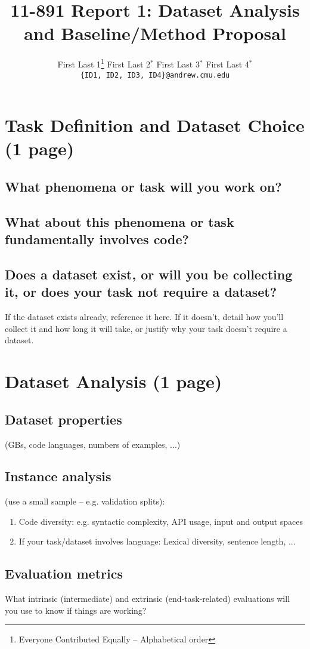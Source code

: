 \documentclass[11pt,a4paper]{article}
\title{11-891 Report 1: Dataset Analysis and Baseline/Method Proposal}
\author{
  First Last 1\thanks{\hspace{4pt}Everyone Contributed Equally -- Alphabetical order} \hspace{2em} First Last 2$^*$ \hspace{2em} First Last 3$^*$ \hspace{2em} First Last 4$^*$ \\
  \texttt{\{ID1, ID2, ID3, ID4\}@andrew.cmu.edu}
  }
\date{}
\begin{document}
\maketitle

\section{Task Definition and Dataset Choice (1 page)}

\subsection{What phenomena or task will you work on?}

\subsection{What about this phenomena or task fundamentally involves code?}

\subsection{Does a dataset exist, or will you be collecting it, or does your task not require a dataset?}
If the dataset exists already, reference it here. If it doesn't, detail how you'll collect it and how long it will take, or justify why your task doesn't require a dataset.

\clearpage
\section{Dataset Analysis (1 page)}
\label{sec:dataset-analysis}
\subsection{Dataset properties} (GBs, code languages, numbers of examples, ...)
\subsection{Instance analysis}
(use a small sample -- e.g. validation splits):
  \begin{enumerate}
    \item Code diversity: e.g. syntactic complexity, API usage, input and output spaces
    \item If your task/dataset involves language: Lexical diversity, sentence length, ...
  \end{enumerate}
\subsection{Evaluation metrics}
What intrinsic (intermediate) and extrinsic (end-task-related) evaluations will you use to know if things are working?
\end{document}
